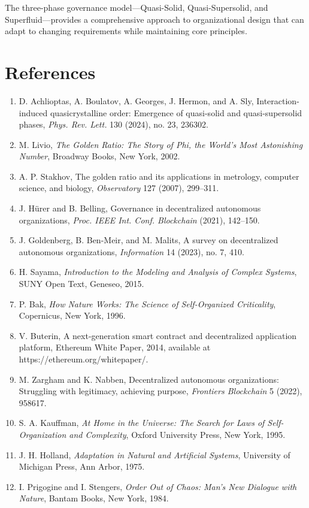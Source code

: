 \documentclass[AMA]{WileyNJD-AMA}
\begin{document}
The three-phase governance model---Quasi-Solid, Quasi-Supersolid, and Superfluid---provides a comprehensive approach to organizational design that can adapt to changing requirements while maintaining core principles.

\section*{References}

\begin{enumerate}

\item D. Achlioptas, A. Boulatov, A. Georges, J. Hermon, and A. Sly, Interaction-induced quasicrystalline order: Emergence of quasi-solid and quasi-supersolid phases, \emph{Phys. Rev. Lett.} 130 (2024), no. 23, 236302.

\item M. Livio, \emph{The Golden Ratio: The Story of Phi, the World's Most Astonishing Number}, Broadway Books, New York, 2002.

\item A. P. Stakhov, The golden ratio and its applications in metrology, computer science, and biology, \emph{Observatory} 127 (2007), 299--311.

\item J. H\"urer and B. Belling, Governance in decentralized autonomous organizations, \emph{Proc. IEEE Int. Conf. Blockchain} (2021), 142--150.

\item J. Goldenberg, B. Ben-Meir, and M. Malits, A survey on decentralized autonomous organizations, \emph{Information} 14 (2023), no. 7, 410.

\item H. Sayama, \emph{Introduction to the Modeling and Analysis of Complex Systems}, SUNY Open Text, Geneseo, 2015.

\item P. Bak, \emph{How Nature Works: The Science of Self-Organized Criticality}, Copernicus, New York, 1996.

\item V. Buterin, A next-generation smart contract and decentralized application platform, Ethereum White Paper, 2014, available at https://ethereum.org/whitepaper/.

\item M. Zargham and K. Nabben, Decentralized autonomous organizations: Struggling with legitimacy, achieving purpose, \emph{Frontiers Blockchain} 5 (2022), 958617.

\item S. A. Kauffman, \emph{At Home in the Universe: The Search for Laws of Self-Organization and Complexity}, Oxford University Press, New York, 1995.

\item J. H. Holland, \emph{Adaptation in Natural and Artificial Systems}, University of Michigan Press, Ann Arbor, 1975.

\item I. Prigogine and I. Stengers, \emph{Order Out of Chaos: Man's New Dialogue with Nature}, Bantam Books, New York, 1984.

\end{enumerate}
\end{document}
